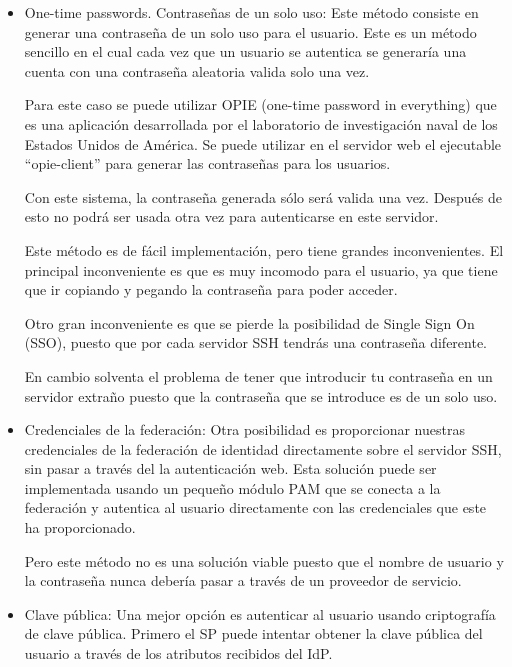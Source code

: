     \begin{itemize}
        
        \item{One-time passwords. Contraseñas de un solo uso:}
        Este método consiste en generar una contraseña de un solo uso
        para el usuario. Este es un método sencillo en el cual cada
        vez que un usuario se autentica se generaría una cuenta con
        una contraseña aleatoria valida solo una vez.

        Para este caso se puede utilizar OPIE (one-time password in
        everything) que es una aplicación desarrollada por el
        laboratorio de investigación naval de los Estados Unidos de
        América. Se puede utilizar en el servidor web el ejecutable
        ``opie-client'' para generar las contraseñas para los
        usuarios.

        Con este sistema, la contraseña generada sólo será valida una
        vez. Después de esto no podrá ser usada otra vez para
        autenticarse en este servidor.

        Este método es de fácil implementación, pero tiene grandes
        inconvenientes. El principal inconveniente es que es muy
        incomodo para el usuario, ya que tiene que ir copiando y
        pegando la contraseña para poder acceder.

        Otro gran inconveniente es que se pierde la posibilidad de
        Single Sign On (SSO), puesto que por cada servidor SSH tendrás
        una contraseña diferente.

        En cambio solventa el problema de tener que introducir tu
        contraseña en un servidor extraño puesto que la contraseña
        que se introduce es de un solo uso.

        \item{Credenciales de la federación:} 
        Otra posibilidad es proporcionar nuestras credenciales de la
        federación de identidad directamente sobre el servidor SSH,
        sin pasar a través del la autenticación web. Esta solución
        puede ser implementada usando un pequeño módulo PAM que se
        conecta a la federación y autentica al usuario directamente
        con las credenciales que este ha proporcionado.

        Pero este método no es una solución viable puesto que el
        nombre de usuario y la contraseña nunca debería pasar a través
        de un proveedor de servicio.

        \item{Clave pública:}
        Una mejor opción es autenticar al usuario usando criptografía
        de clave pública. Primero el SP puede intentar obtener la
        clave pública del usuario a través de los atributos recibidos
        del IdP.
        

\end{itemize}
